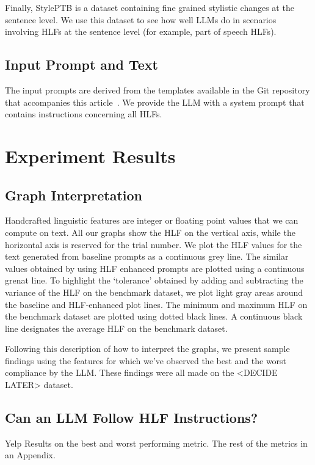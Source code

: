 \documentclass[runningheads,a4paper,11pt]{article}
\begin{document}
Finally, StylePTB is a dataset containing fine grained stylistic changes at the
sentence level. We use this dataset to see how well LLMs do in scenarios
involving HLFs at the sentence level (for example, part of speech HLFs).

\subsection{Input Prompt and Text}\label{input-text}

The input prompts are derived from the templates available in the Git repository
that accompanies this article~\cite{olar2024experimentcode}.
We provide the LLM with a system prompt that contains instructions concerning
all HLFs.

\section{Experiment Results}

\subsection{Graph Interpretation}

Handcrafted linguistic features are integer or floating point values that we
can compute on text.
All our graphs show the HLF on the vertical axis, while the horizontal axis is
reserved for the trial number.
We plot the HLF values for the text generated from baseline prompts as a
continuous grey line.
The similar values obtained by using HLF enhanced prompts are plotted using a
continuous grenat line.
To highlight the `tolerance' obtained by adding and subtracting the variance of
the HLF on the benchmark dataset, we plot light gray areas around the baseline
and HLF-enhanced plot lines.
The minimum and maximum HLF on the benchmark dataset are plotted using dotted
black lines.
A continuous black line designates the average HLF on the benchmark dataset.

Following this description of how to interpret the graphs, we present sample
findings using the features for which we've observed the best and the worst
compliance by the LLM.
These findings were all made on the <DECIDE LATER> dataset.

\subsection{Can an LLM Follow HLF Instructions?}

Yelp Results on the best and worst performing metric.
The rest of the metrics in an Appendix.
\end{document}
